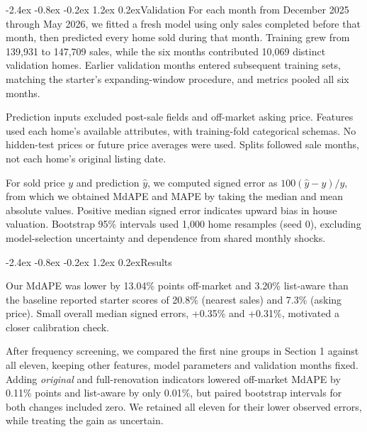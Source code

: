 \documentclass[11pt,a4paper]{article}
\makeatletter
\renewcommand\section{\@startsection{section}{1}{\z@}
  {-2.4ex \@plus -0.8ex \@minus -0.2ex}
  {1.2ex \@plus 0.2ex}{\normalfont\Large\bfseries}}
\makeatother
\begin{document}
\section{Validation}
For each month from December 2025 through May 2026, we fitted a fresh model using only sales
completed before that month, then predicted every home sold during that month. Training grew from
139,931 to 147,709 sales, while the six months contributed 10,069 distinct validation homes.
Earlier validation months entered subsequent training sets, matching the starter's expanding-window
procedure, and metrics pooled all six months.

Prediction inputs excluded post-sale fields and off-market asking price. Features used each home's
available attributes, with training-fold categorical schemas. No hidden-test prices or future price
averages were used. Splits followed sale months, not each home's original listing date.

For sold price $y$ and prediction $\hat y$, we computed signed error as $100(\hat y-y)/y$,
from which we obtained MdAPE and MAPE by taking the median and mean absolute values.
Positive median signed error indicates upward bias in house valuation.
Bootstrap 95\% intervals used 1,000 home resamples (seed 0), excluding model-selection uncertainty
and dependence from shared monthly shocks.

\section{Results}
\begin{table}[ht]
\centering
\resizebox{\linewidth}{!}{}
\caption{Walk-forward validation on the listings. MdAPE: median absolute percentage error.
MAPE: mean absolute percentage error. Brackets: bootstrap 95\% interval.}
\end{table}

Our MdAPE was lower by 13.04\% points off-market and 3.20\% list-aware than the baseline
reported starter scores of 20.8\% (nearest sales) and 7.3\% (asking price). Small overall median
signed errors, +0.35\% and +0.31\%, motivated a closer calibration check.

After frequency screening, we compared the first nine groups in Section 1 against all eleven,
keeping other features, model parameters and validation months fixed. Adding \textit{original} and
full-renovation indicators lowered off-market MdAPE by 0.11\% points and list-aware by
only 0.01\%, but paired bootstrap intervals for both changes included zero. We retained all eleven
for their lower observed errors, while treating the gain as uncertain.
\end{document}
